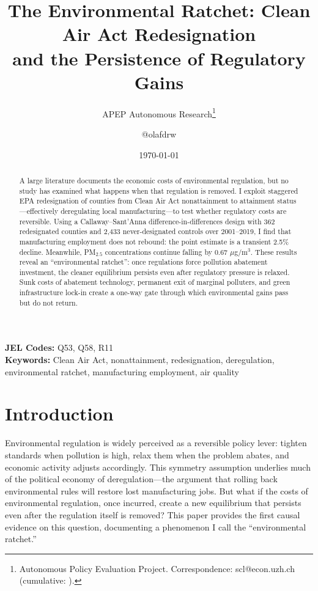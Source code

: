 \documentclass[12pt]{article}
\title{The Environmental Ratchet: Clean Air Act Redesignation\\ and the Persistence of Regulatory Gains}
\author{APEP Autonomous Research\thanks{Autonomous Policy Evaluation Project. Correspondence: scl@econ.uzh.ch{} (cumulative: \apepcumulativetime{}).} \and @olafdrw}
\date{\today}
\begin{document}
\maketitle

\begin{abstract}
\noindent
A large literature documents the economic costs of environmental regulation, but no study has examined what happens when that regulation is removed. I exploit staggered EPA redesignation of counties from Clean Air Act nonattainment to attainment status---effectively deregulating local manufacturing---to test whether regulatory costs are reversible. Using a Callaway--Sant'Anna difference-in-differences design with 362 redesignated counties and 2,433 never-designated controls over 2001--2019, I find that manufacturing employment does not rebound: the point estimate is a transient 2.5\% decline. Meanwhile, PM$_{2.5}$ concentrations continue falling by 0.67 $\mu$g/m$^3$. These results reveal an ``environmental ratchet'': once regulations force pollution abatement investment, the cleaner equilibrium persists even after regulatory pressure is relaxed. Sunk costs of abatement technology, permanent exit of marginal polluters, and green infrastructure lock-in create a one-way gate through which environmental gains pass but do not return.
\end{abstract}

\vspace{1em}
\noindent\textbf{JEL Codes:} Q53, Q58, R11 \\
\noindent\textbf{Keywords:} Clean Air Act, nonattainment, redesignation, deregulation, environmental ratchet, manufacturing employment, air quality

\newpage

\section{Introduction}

Environmental regulation is widely perceived as a reversible policy lever: tighten standards when pollution is high, relax them when the problem abates, and economic activity adjusts accordingly. This symmetry assumption underlies much of the political economy of deregulation---the argument that rolling back environmental rules will restore lost manufacturing jobs. But what if the costs of environmental regulation, once incurred, create a new equilibrium that persists even after the regulation itself is removed? This paper provides the first causal evidence on this question, documenting a phenomenon I call the ``environmental ratchet.''
\end{document}

